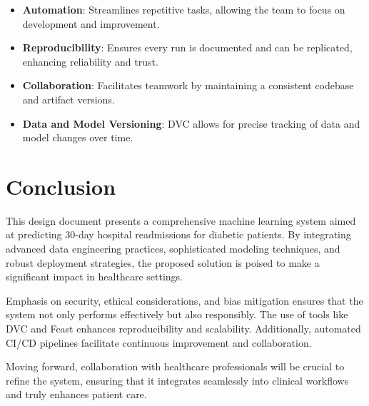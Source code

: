 \documentclass{article}
\begin{document}
\begin{itemize}[leftmargin=*]
    \item \textbf{Automation}: Streamlines repetitive tasks, allowing the team to focus on development and improvement.
    \item \textbf{Reproducibility}: Ensures every run is documented and can be replicated, enhancing reliability and trust.
    \item \textbf{Collaboration}: Facilitates teamwork by maintaining a consistent codebase and artifact versions.
    \item \textbf{Data and Model Versioning}: DVC allows for precise tracking of data and model changes over time.
\end{itemize}

\section{Conclusion}

This design document presents a comprehensive machine learning system aimed at predicting 30-day hospital readmissions for diabetic patients. By integrating advanced data engineering practices, sophisticated modeling techniques, and robust deployment strategies, the proposed solution is poised to make a significant impact in healthcare settings.

Emphasis on security, ethical considerations, and bias mitigation ensures that the system not only performs effectively but also responsibly. The use of tools like DVC and Feast enhances reproducibility and scalability. Additionally, automated CI/CD pipelines facilitate continuous improvement and collaboration.

Moving forward, collaboration with healthcare professionals will be crucial to refine the system, ensuring that it integrates seamlessly into clinical workflows and truly enhances patient care.

\nocite{*}
\printbibliography
\end{document}
